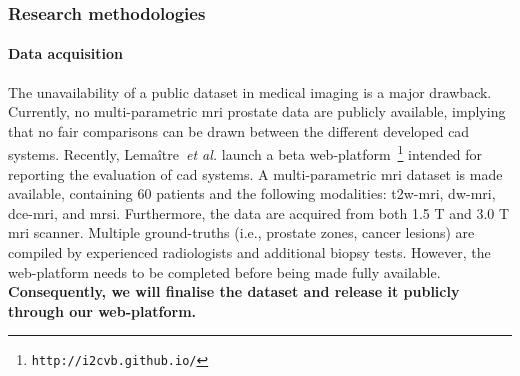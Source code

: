 
\subsubsection{Research methodologies}
\label{sec:methodologies}

\paragraph{Data acquisition}

The unavailability of a public dataset in medical imaging is a major drawback.
Currently, no multi-parametric \ac{mri} prostate data are publicly available, implying that no fair comparisons can be drawn between the different developed \ac{cad} systems.
Recently, Lema\^itre~\emph{et al.} launch a beta web-platform~\footnote{\texttt{http://i2cvb.github.io/}} intended for reporting the evaluation of \ac{cad} systems.
A multi-parametric \ac{mri} dataset is made available, containing 60 patients and the following modalities: \ac{t2w}-\ac{mri}, \ac{dw}-\ac{mri}, \ac{dce}-\ac{mri}, and \ac{mrsi}.
Furthermore, the data are acquired from both 1.5 T and 3.0 T \ac{mri} scanner.
Multiple ground-truths (i.e., prostate zones, cancer lesions) are compiled by experienced radiologists and additional biopsy tests.
However, the web-platform needs to be completed before being made fully available.
\textbf{Consequently, we will finalise the dataset and release it publicly through our web-platform.}

